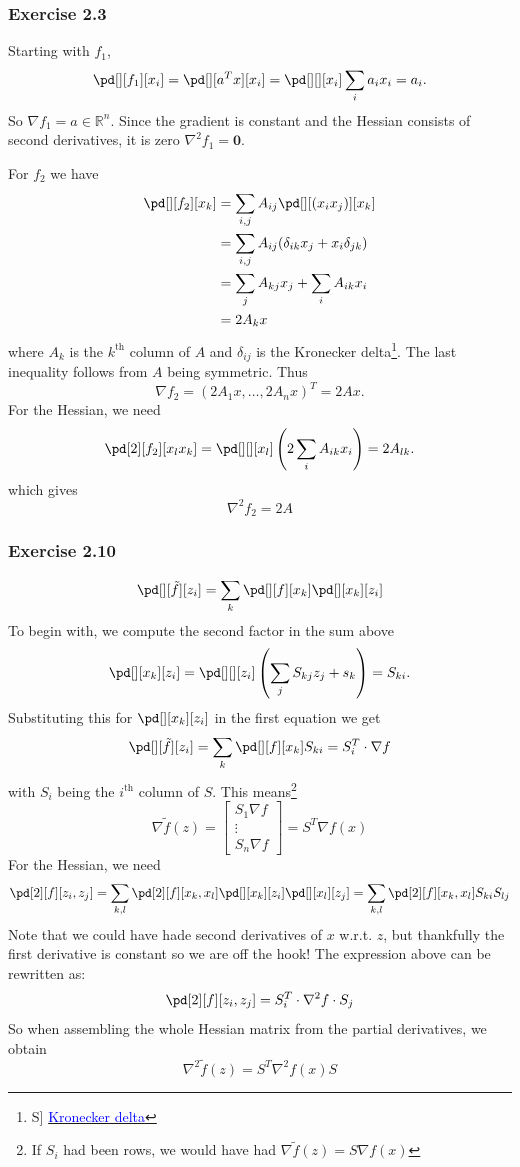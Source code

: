 \subsubsection{Exercise 2.3}
Starting with $f_1$,
\[
    \pd[][f_1][x_i]  = \pd[][a^Tx][x_i] = \pd[][][x_i]\sum_i a_ix_i = a_i.
\]
So $\nabla f_1 = a\in\mathbb{R}^n$.
Since the gradient is constant and the Hessian consists of second derivatives, it is zero $\nabla^2f_1 = \mathbf0$.

For $f_2$ we have
\begin{align*}
    \pd[][f_2][x_k] & = \sum_{i,j} A_{ij}\pd[][(x_ix_j)][x_k] \\ &=\sum_{i,j}A_{ij}(\delta_{ik}x_j + x_i\delta_{jk}) \\
                    & =\sum_{j}A_{kj}x_j + \sum_i A_{ik}x_i   \\
                    & =2A_kx
\end{align*}
where $A_k$ is the $k^{\text{th}}$ column of $A$ and $\delta_{ij}$ is the Kronecker delta\footnote{S] \href{https://en.wikipedia.org/wiki/Kronecker_delta}{\textcolor{blue}{Kronecker delta}}}.
The last inequality follows from $A$ being symmetric.
Thus
\[
    \nabla f_2 = (2A_1x,\dots,2A_nx)^T = 2 A x.
\]
For the Hessian, we need
\[
    \pd[2][f_2][x_lx_k] = \pd[][][x_l]\left(2\sum_iA_{ik}x_i\right) = 2A_{lk}.
\]
which gives
\[
    \nabla^2f_2 = 2A
\]
\subsubsection{Exercise 2.10}
\[
    \pd[][\tilde{f}][z_i] = \sum_k\pd[][f][x_k]\pd[][x_k][z_i]
\]
To begin with, we compute the second factor in the sum above
\[
    \pd[][x_k][z_i] = \pd[][][z_i]\left( \sum_jS_{kj}z_j + s_k\right) = S_{ki}.
\]
Substituting this for $\pd[][x_k][z_i]$ in the first equation we get
\[
    \pd[][\tilde{f}][z_i] = \sum_k \pd[][f][x_k] S_{ki} = S_i^T \cdot \nabla f
\]
with $S_i$ being the $i^{\text{th}}$ column of $S$.
This means\footnote{If $S_i$ had been rows, we would have had $\nabla \tilde{f}(z) = S\nabla f(x)$}
\[
    \nabla \tilde{f}(z) = \begin{bmatrix}
        S_1 \nabla f \\
        \vdots       \\
        S_n \nabla f
    \end{bmatrix} = S^T\nabla f(x)
\]
For the Hessian, we need
\[
    \pd[2][f][z_i,z_j] = \sum_{k,l}\pd[2][f][x_k,x_l]\pd[][x_k][z_i]\pd[][x_l][z_j] = \sum_{k,l} \pd[2][f][x_k,x_l]S_{ki}S_{lj}
\]
Note that we could have hade second derivatives of $x$ w.r.t. $z$, but thankfully the first derivative is constant so we are off the hook!
The expression above can be rewritten as:
\[
    \pd[2][f][z_i,z_j] = S_i^T \cdot \nabla^2 f \cdot  S_j
\]
So when assembling the whole Hessian matrix from the partial derivatives, we obtain
\[
    \nabla^2 \tilde{f}(z) = S^T \nabla^2 f(x) S
\]
\hfill\sq
